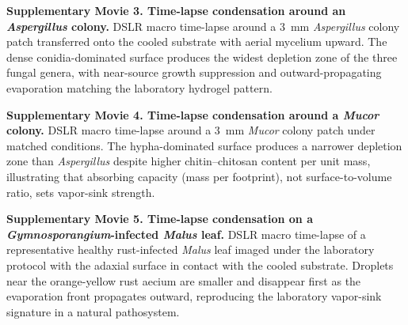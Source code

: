 \documentclass[11pt]{article}
\begin{document}
\vspace{1em}
\noindent\textbf{Supplementary Movie 3. Time-lapse condensation around an \textit{Aspergillus} colony.} DSLR macro time-lapse around a 3~mm \textit{Aspergillus} colony patch transferred onto the cooled substrate with aerial mycelium upward. The dense conidia-dominated surface produces the widest depletion zone of the three fungal genera, with near-source growth suppression and outward-propagating evaporation matching the laboratory hydrogel pattern.

\vspace{1em}
\noindent\textbf{Supplementary Movie 4. Time-lapse condensation around a \textit{Mucor} colony.} DSLR macro time-lapse around a 3~mm \textit{Mucor} colony patch under matched conditions. The hypha-dominated surface produces a narrower depletion zone than \textit{Aspergillus} despite higher chitin--chitosan content per unit mass, illustrating that absorbing capacity (mass per footprint), not surface-to-volume ratio, sets vapor-sink strength.

\vspace{1em}
\noindent\textbf{Supplementary Movie 5. Time-lapse condensation on a \textit{Gymnosporangium}-infected \textit{Malus} leaf.} DSLR macro time-lapse of a representative healthy rust-infected \textit{Malus} leaf imaged under the laboratory protocol with the adaxial surface in contact with the cooled substrate. Droplets near the orange-yellow rust aecium are smaller and disappear first as the evaporation front propagates outward, reproducing the laboratory vapor-sink signature in a natural pathosystem.
\end{document}
